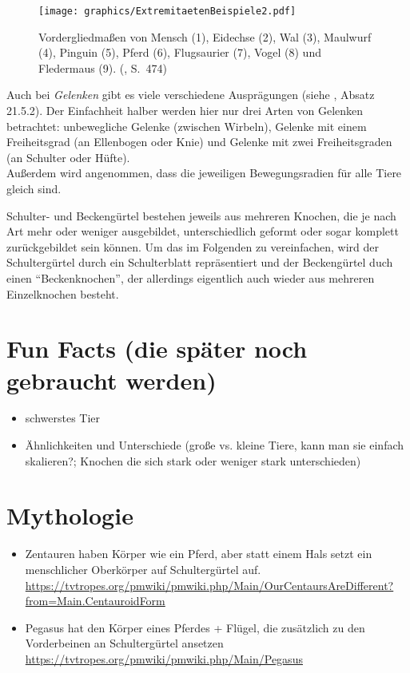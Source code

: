 \begin{figure}
 \centering
 \texttt{[image: graphics/ExtremitaetenBeispiele2.pdf]}
 \caption{Vordergliedmaßen von Mensch (1), Eidechse (2), Wal (3), Maulwurf (4), Pinguin (5), Pferd (6), Flugsaurier (7), Vogel (8) und Fledermaus (9). (\cite{dtvBiologie}, S.\ 474)}
 \label{bsp_extremitaeten2}
\end{figure}

Auch bei \emph{Gelenken} gibt es viele verschiedene Ausprägungen (siehe \cite{Vergleichende_Anatomie}, Absatz 21.5.2). Der Einfachheit halber werden hier nur drei Arten von Gelenken betrachtet: unbewegliche Gelenke (\zb zwischen Wirbeln), Gelenke mit einem Freiheitsgrad (\zb an Ellenbogen oder Knie) und Gelenke mit zwei Freiheitsgraden (\zb an Schulter oder Hüfte).
\\
Außerdem wird angenommen, dass die jeweiligen Bewegungsradien für alle Tiere gleich sind.

Schulter- und Beckengürtel bestehen  jeweils aus mehreren Knochen, die je nach Art mehr oder weniger ausgebildet, unterschiedlich geformt oder sogar komplett zurückgebildet sein können. Um das im Folgenden zu vereinfachen, wird der Schultergürtel durch ein Schulterblatt repräsentiert und der Beckengürtel duch einen "`Beckenknochen"', der allerdings eigentlich auch wieder aus mehreren Einzelknochen besteht.



\section{Fun Facts (die später noch gebraucht werden)}

\begin{itemize}
 \item schwerstes Tier
 \item Ähnlichkeiten und Unterschiede (\zb große vs. kleine Tiere, kann man sie einfach skalieren?; Knochen die sich stark oder weniger stark unterschieden)
\end{itemize}

\section{Mythologie}

\begin{itemize}
 \item Zentauren haben Körper wie ein Pferd, aber statt einem Hals setzt ein menschlicher Oberkörper auf Schultergürtel auf.\\
 \url{https://tvtropes.org/pmwiki/pmwiki.php/Main/OurCentaursAreDifferent?from=Main.CentauroidForm}
 \item Pegasus hat den Körper eines Pferdes + Flügel, die zusätzlich zu den Vorderbeinen an Schultergürtel ansetzen\\
 \url{https://tvtropes.org/pmwiki/pmwiki.php/Main/Pegasus}
\end{itemize}

